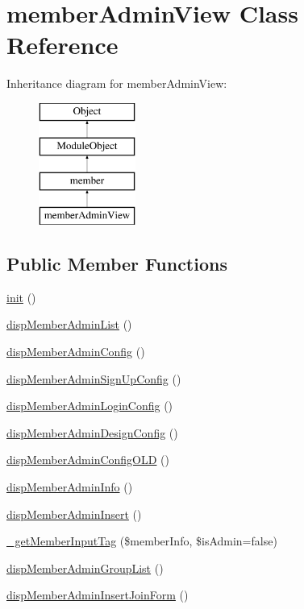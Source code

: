 \hypertarget{classmemberAdminView}{\section{member\-Admin\-View Class Reference}
\label{classmemberAdminView}
}
Inheritance diagram for member\-Admin\-View\-:\begin{figure}[H]
\begin{center}
\leavevmode
\includegraphics[height=4.000000cm]{classmemberAdminView}
\end{center}
\end{figure}
\subsection*{Public Member Functions}
\begin{DoxyCompactItemize}
\item 
\hyperlink{classmemberAdminView_abfcff5343cc06cfa70fa1994b8a77d05}{init} ()
\item 
\hyperlink{classmemberAdminView_ab234e23e8317000c0f1722ab0f54ab99}{disp\-Member\-Admin\-List} ()
\item 
\hyperlink{classmemberAdminView_a8b5394bc1e9e1aae78bfaccad8e0edc9}{disp\-Member\-Admin\-Config} ()
\item 
\hyperlink{classmemberAdminView_af3ab8ea3d555e7e685c6c4706e3ea545}{disp\-Member\-Admin\-Sign\-Up\-Config} ()
\item 
\hyperlink{classmemberAdminView_a98debda6b76587e3633453e68c58a955}{disp\-Member\-Admin\-Login\-Config} ()
\item 
\hyperlink{classmemberAdminView_ab9f3ed7d905d09ea8ad49acdc22fe326}{disp\-Member\-Admin\-Design\-Config} ()
\item 
\hyperlink{classmemberAdminView_ad609a62a6d1aa8ec0c33fb6e30e20f08}{disp\-Member\-Admin\-Config\-O\-L\-D} ()
\item 
\hyperlink{classmemberAdminView_a9e87c4fbbb859f2557457b1935453dd4}{disp\-Member\-Admin\-Info} ()
\item 
\hyperlink{classmemberAdminView_ad7a3311686a49ab70e318fb66736258a}{disp\-Member\-Admin\-Insert} ()
\item 
\hyperlink{classmemberAdminView_a49f5bc2cf86576c040abfb686c21383b}{\-\_\-get\-Member\-Input\-Tag} (\$member\-Info, \$is\-Admin=false)
\item 
\hyperlink{classmemberAdminView_a4a1e4b416515bdcdb1459f44398eb412}{disp\-Member\-Admin\-Group\-List} ()
\item 
\hyperlink{classmemberAdminView_a049d24f5adc0c5eb534902e44944ff08}{disp\-Member\-Admin\-Insert\-Join\-Form} ()
\end{DoxyCompactItemize}
